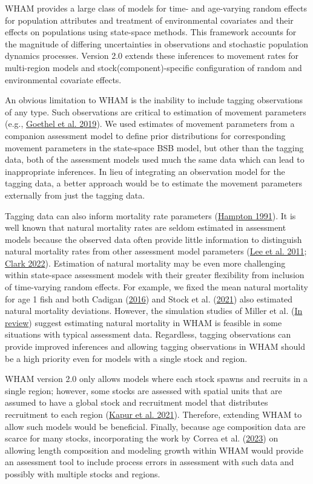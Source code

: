 \documentclass[
]{article}
\begin{document}
WHAM provides a large class of models for time- and age-varying random effects for population attributes and treatment of environmental covariates and their effects on populations using state-space methods. This framework accounts for the magnitude of differing uncertainties in observations and stochastic population dynamics processes. Version 2.0 extends these inferences to movement rates for multi-region models and stock(component)-specific configuration of random and environmental covariate effects.

An obvious limitation to WHAM is the inability to include tagging observations of any type. Such observations are critical to estimation of movement parameters (e.g., \protect\hyperlink{ref-goetheletal19}{Goethel et al. 2019}). We used estimates of movement parameters from a companion assessment model to define prior distributions for corresponding movement parameters in the state-space BSB model, but other than the tagging data, both of the assessment models used much the same data which can lead to inappropriate inferences. In lieu of integrating an observation model for the tagging data, a better approach would be to estimate the movement parameters externally from just the tagging data.

Tagging data can also inform mortality rate parameters (\protect\hyperlink{ref-hampton91}{Hampton 1991}). It is well known that natural mortality rates are seldom estimated in assessment models because the observed data often provide little information to distinguish natural mortality rates from other assessment model parameters (\protect\hyperlink{ref-leeetal11}{Lee et al. 2011}; \protect\hyperlink{ref-clark22}{Clark 2022}). Estimation of natural mortality may be even more challenging within state-space assessment models with their greater flexibility from inclusion of time-varying random effects. For example, we fixed the mean natural mortality for age 1 fish and both Cadigan (\protect\hyperlink{ref-cadigan16}{2016}) and Stock et al. (\protect\hyperlink{ref-stocketal21}{2021}) also estimated natural mortality deviations. However, the simulation studies of Miller et al. (\protect\hyperlink{ref-milleretalinreview1}{In review}) suggest estimating natural mortality in WHAM is feasible in some situations with typical assessment data. Regardless, tagging observations can provide improved inferences and allowing tagging observations in WHAM should be a high priority even for models with a single stock and region.

WHAM version 2.0 only allows models where each stock spawns and recruits in a single region; however, some stocks are assessed with spatial units that are assumed to have a global stock and recruitment model that distributes recruitment to each region (\protect\hyperlink{ref-kapuretal21}{Kapur et al. 2021}). Therefore, extending WHAM to allow such models would be beneficial. Finally, because age composition data are scarce for many stocks, incorporating the work by Correa et al. (\protect\hyperlink{ref-correaetal23}{2023}) on allowing length composition and modeling growth within WHAM would provide an assessment tool to include process errors in assessment with such data and possibly with multiple stocks and regions.
\end{document}
